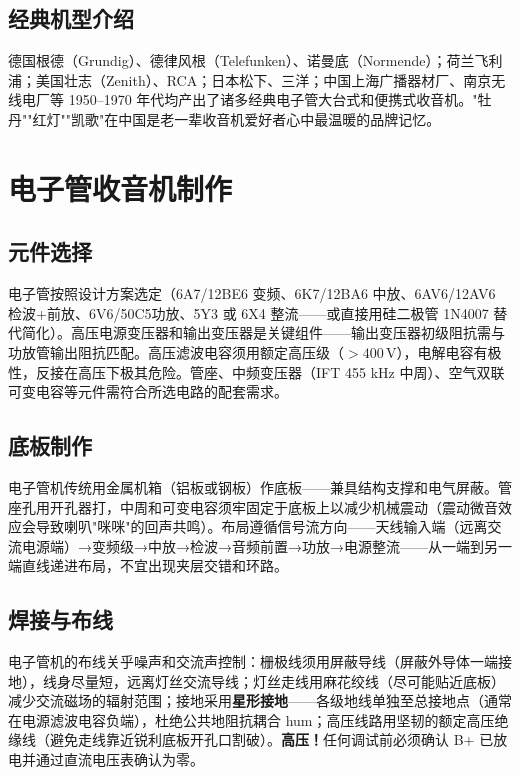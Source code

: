 \documentclass[12pt,UTF8]{ctexbook}
\begin{document}
\subsection{经典机型介绍}

德国根德（Grundig）、德律风根（Telefunken）、诺曼底（Normende）；荷兰飞利浦；美国壮志（Zenith）、RCA；日本松下、三洋；中国上海广播器材厂、南京无线电厂等 1950–1970 年代均产出了诸多经典电子管大台式和便携式收音机。"牡丹""红灯""凯歌"在中国是老一辈收音机爱好者心中最温暖的品牌记忆。

\section{电子管收音机制作}
\label{sec:tube_radio_building}

\subsection{元件选择}

电子管按照设计方案选定（6A7/12BE6 变频、6K7/12BA6 中放、6AV6/12AV6 检波+前放、6V6/50C5功放、5Y3 或 6X4 整流——或直接用硅二极管 1N4007 替代简化）。高压电源变压器和输出变压器是关键组件——输出变压器初级阻抗需与功放管输出阻抗匹配。高压滤波电容须用额定高压级（$>400\,\mathrm{V}$），电解电容有极性，反接在高压下极其危险。管座、中频变压器（IFT 455 kHz 中周）、空气双联可变电容等元件需符合所选电路的配套需求。

\subsection{底板制作}

电子管机传统用金属机箱（铝板或钢板）作底板——兼具结构支撑和电气屏蔽。管座孔用开孔器打，中周和可变电容须牢固定于底板上以减少机械震动（震动微音效应会导致喇叭"咪咪"的回声共鸣）。布局遵循信号流方向——天线输入端（远离交流电源端）→变频级→中放→检波→音频前置→功放→电源整流——从一端到另一端直线递进布局，不宜出现夹层交错和环路。

\subsection{焊接与布线}

电子管机的布线关乎噪声和交流声控制：栅极线须用屏蔽导线（屏蔽外导体一端接地），线身尽量短，远离灯丝交流导线；灯丝走线用麻花绞线（尽可能贴近底板）减少交流磁场的辐射范围；接地采用\textbf{星形接地}——各级地线单独至总接地点（通常在电源滤波电容负端），杜绝公共地阻抗耦合 hum；高压线路用坚韧的额定高压绝缘线（避免走线靠近锐利底板开孔口割破）。\textbf{高压！}任何调试前必须确认 B+ 已放电并通过直流电压表确认为零。
\end{document}
